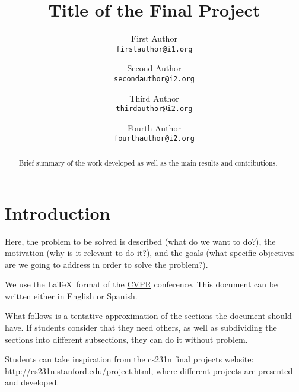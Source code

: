 \documentclass[10pt,twocolumn,letterpaper]{article}
\begin{document}
\title{Title of the Final Project}

\author{First Author\\
{\tt\small firstauthor@i1.org}
\and
Second Author\\
{\tt\small secondauthor@i2.org}
\and
Third Author\\
{\tt\small thirdauthor@i2.org}
\and
Fourth Author\\
{\tt\small fourthauthor@i2.org}
}
\maketitle

\begin{abstract}
   Brief summary of the work developed as well as the main results and contributions. 
   
   
\end{abstract}

\section{Introduction}
\label{sec:intro}

Here, the problem to be solved is described (what do we want to do?), the motivation (why is it relevant to do it?), and the goals (what specific objectives are we going to address in order to solve the problem?).

We use the \LaTeX\  format of the \href{https://en.wikipedia.org/wiki/Conference_on_Computer_Vision_and_Pattern_Recognition}{CVPR} conference. This document can be written either in English or Spanish. 

What follows is a tentative approximation of the sections the document should have. If students consider that they need others, as well as subdividing the sections into different subsections, they can do it without problem.

Students can take inspiration from the \href{http://cs231n.stanford.edu/index.html}{cs231n} final projects website: \url{http://cs231n.stanford.edu/project.html}, where different projects are presented and developed. 
\end{document}
